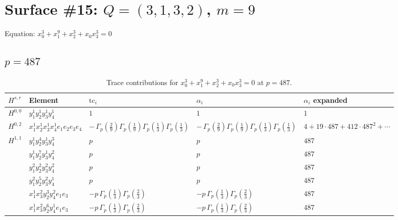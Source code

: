 \documentclass[11pt]{article}
\begin{document}
\newpage

\section*{Surface \#15: $Q=(3, 1, 3, 2)$, $m=9$}

Equation: $x_0^{3} + x_1^{9} + x_2^{3} + x_0 x_3^{3} = 0$

\subsection*{$p = 487$}

\begin{table}[ht]
\centering
\caption{Trace contributions for $x_0^{3} + x_1^{9} + x_2^{3} + x_0 x_3^{3} = 0$ at $p=487$.}\label{tab:deformed-15}
\renewcommand{\arraystretch}{1.1}
{\scriptsize
\begin{tabular}{@{}lllll@{}}
\toprule
$H^{s,r}$ & Element & $\mathrm{tc}_i$ & $\alpha_i$ & $\alpha_i$ expanded \\
\midrule
$H^{0,0}$ & $y_{1}^{1} y_{2}^{1} y_{3}^{1} y_{4}^{1}$ & $1$ & $1$ & $1$ \\
\midrule
$H^{0,2}$ & $x_{1}^{1} x_{2}^{1} x_{3}^{1} x_{4}^{1}  e_{1} e_{2} e_{3} e_{4}$ & $- \, \Gamma_p \left( \frac{2}{9} \right) \Gamma_p \left( \frac{1}{9} \right) \Gamma_p \left( \frac{1}{3} \right) \Gamma_p \left( \frac{1}{3} \right)$ & $- \, \Gamma_p \left( \frac{2}{9} \right) \Gamma_p \left( \frac{1}{9} \right) \Gamma_p \left( \frac{1}{3} \right) \Gamma_p \left( \frac{1}{3} \right)$ & $4{+}19{\cdot}487{+}412{\cdot}487^{2}{+}\cdots$ \\
\midrule
$H^{1,1}$ & $y_{1}^{1} y_{2}^{4} y_{3}^{1} y_{4}^{3}$ & $p \,$ & $p \,$ & $487$ \\
 & $y_{1}^{1} y_{2}^{7} y_{3}^{1} y_{4}^{2}$ & $p \,$ & $p \,$ & $487$ \\
 & $y_{1}^{2} y_{2}^{2} y_{3}^{2} y_{4}^{2}$ & $p \,$ & $p \,$ & $487$ \\
 & $y_{1}^{2} y_{2}^{5} y_{3}^{2} y_{4}^{1}$ & $p \,$ & $p \,$ & $487$ \\
 & $x_{1}^{1} x_{3}^{2} y_{2}^{3} y_{4}^{2} e_{1} e_{3}$ & $- p \, \Gamma_p \left( \frac{1}{3} \right) \Gamma_p \left( \frac{2}{3} \right)$ & $- p \, \Gamma_p \left( \frac{1}{3} \right) \Gamma_p \left( \frac{2}{3} \right)$ & $487$ \\
 & $x_{1}^{1} x_{3}^{2} y_{2}^{6} y_{4}^{1} e_{1} e_{3}$ & $- p \, \Gamma_p \left( \frac{1}{3} \right) \Gamma_p \left( \frac{2}{3} \right)$ & $- p \, \Gamma_p \left( \frac{1}{3} \right) \Gamma_p \left( \frac{2}{3} \right)$ & $487$ \\

\end{tabular}}
\end{table}
\end{document}
